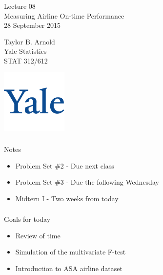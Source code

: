 



\begin{frame}[fragile] \frametitle{}

\vfill

{\fontsize{0.7cm}{0cm}\selectfont Lecture 08 \\\vspace{0.2cm}
Measuring Airline On-time Performance}\\\vspace{0.5cm}
28 September 2015

\vspace{2cm}

\begin{minipage}{0.6\textwidth}
Taylor B. Arnold \\
Yale Statistics \\
STAT 312/612
\end{minipage}
\hfill
\begin{minipage}{0.3\textwidth}\raggedleft
\includegraphics[scale=0.3]{../yale-logo.png}
\end{minipage}%

\end{frame}

\begin{frame}[fragile] \frametitle{}

{\color{yaleblue}\fontsize{16pt}{20pt}\selectfont Notes}

\begin{itemize}
\item Problem Set \#2 - Due next class
\item Problem Set \#3 - Due the following Wednesday
\item Midtern I - Two weeks from today
\end{itemize}

\end{frame}

\begin{frame}[fragile] \frametitle{}

{\color{yaleblue}\fontsize{16pt}{20pt}\selectfont Goals for today}

\begin{itemize}
\item Review of time
\item Simulation of the multivariate F-test
\item Introduction to ASA airline dataset
\end{itemize}

\end{frame}

